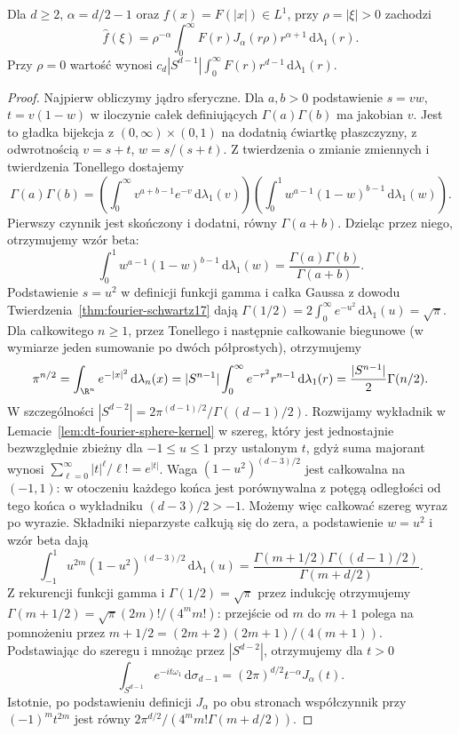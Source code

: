 \begin{twierdzenie}
\label{thm:dt-fourier-radial}
Dla $d\ge2$, $\alpha=d/2-1$ oraz $f(x)=F(|x|)\in L^1$,
przy $\rho=|\xi|>0$ zachodzi
\[
 \widehat f(\xi)=\rho^{-\alpha}\int_0^\infty
 F(r)J_\alpha(r\rho)r^{\alpha+1}\,\mathrm d\lambda_1(r).
\]
Przy $\rho=0$ wartość wynosi
$c_d|S^{d-1}|\int_0^\infty F(r)r^{d-1}\,\mathrm d\lambda_1(r)$.
\end{twierdzenie}
\begin{proof}
Najpierw obliczymy jądro sferyczne. Dla $a,b>0$
podstawienie $s=vw$, $t=v(1-w)$ w iloczynie całek
definiujących $\Gamma(a)\Gamma(b)$ ma jakobian $v$.
Jest to gładka bijekcja z $(0,\infty)\times(0,1)$
na dodatnią ćwiartkę płaszczyzny, z odwrotnością
$v=s+t$, $w=s/(s+t)$. Z twierdzenia o zmianie
zmiennych i twierdzenia Tonellego dostajemy
\[
 \Gamma(a)\Gamma(b)=
 \left(\int_0^\infty v^{a+b-1}e^{-v}\,\mathrm d\lambda_1(v)\right)
 \left(\int_0^1 w^{a-1}(1-w)^{b-1}\,\mathrm d\lambda_1(w)\right).
\]
Pierwszy czynnik jest skończony i dodatni, równy
$\Gamma(a+b)$. Dzieląc przez niego, otrzymujemy wzór beta:
\[
 \int_0^1 w^{a-1}(1-w)^{b-1}\,\mathrm d\lambda_1(w)
 =\frac{\Gamma(a)\Gamma(b)}{\Gamma(a+b)}.
\]
Podstawienie $s=u^2$ w definicji funkcji gamma
i całka Gaussa z dowodu
Twierdzenia~\ref{thm:fourier-schwartz17} dają
$\Gamma(1/2)=2\int_0^\infty e^{-u^2}\,\mathrm d\lambda_1(u)
=\sqrt{\pi}$.
Dla całkowitego $n\ge1$, przez Tonellego i następnie
całkowanie biegunowe (w wymiarze jeden sumowanie
po dwóch półprostych), otrzymujemy
\[
 \pi^{n/2}=\int_{\R^n}e^{-|x|^2}\,\mathrm d\lambda_n(x)
 =|S^{n-1}|\int_0^\infty e^{-r^2}r^{n-1}\,\mathrm d\lambda_1(r)
 =\frac{|S^{n-1}|}{2}\Gamma(n/2).
\]
W szczególności $|S^{d-2}|=2\pi^{(d-1)/2}/\Gamma((d-1)/2)$.
Rozwijamy wykładnik w Lemacie~\ref{lem:dt-fourier-sphere-kernel}
w szereg, który jest jednostajnie bezwzględnie zbieżny
dla $-1\le u\le1$ przy ustalonym $t$, gdyż suma
majorant wynosi $\sum_{\ell=0}^\infty |t|^\ell/\ell!=e^{|t|}$.
Waga $(1-u^2)^{(d-3)/2}$ jest całkowalna na $(-1,1)$:
w otoczeniu każdego końca jest porównywalna
z potęgą odległości od tego końca o wykładniku
$(d-3)/2>-1$. Możemy więc całkować szereg
wyraz po wyrazie. Składniki nieparzyste całkują się do zera, a podstawienie
$w=u^2$ i wzór beta dają
\[
 \int_{-1}^1 u^{2m}(1-u^2)^{(d-3)/2}\,\mathrm d\lambda_1(u)
 =\frac{\Gamma(m+1/2)\Gamma((d-1)/2)}{\Gamma(m+d/2)}.
\]
Z rekurencji funkcji gamma i $\Gamma(1/2)=\sqrt\pi$
przez indukcję otrzymujemy
$\Gamma(m+1/2)=\sqrt{\pi}(2m)!/(4^m m!)$:
przejście od $m$ do $m+1$ polega na pomnożeniu
przez $m+1/2=(2m+2)(2m+1)/(4(m+1))$.
Podstawiając do szeregu i mnożąc przez $|S^{d-2}|$,
otrzymujemy dla $t>0$
\[
 \int_{S^{d-1}}e^{-it\omega_1}\,\mathrm d\sigma_{d-1}
 =(2\pi)^{d/2}t^{-\alpha}J_\alpha(t).
\]
Istotnie, po podstawieniu definicji $J_\alpha$ po obu
stronach współczynnik przy $(-1)^mt^{2m}$ jest równy
$2\pi^{d/2}/(4^m m!\Gamma(m+d/2))$.


\end{proof}
